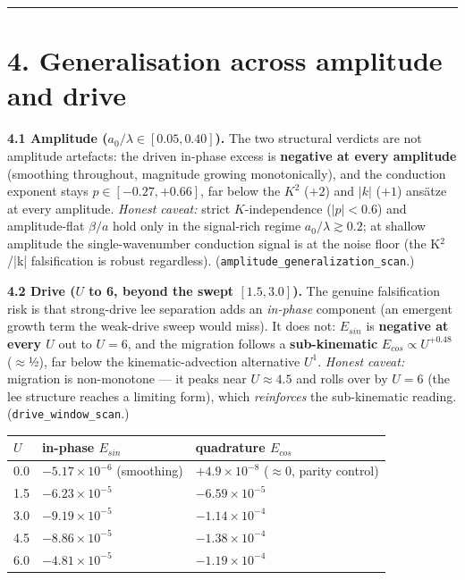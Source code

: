 \documentclass{jfm}
\newcommand{\code}[1]{\texttt{#1}}
\begin{document}
\medskip\hrule\medskip


\section*{4. Generalisation across amplitude and drive}


\textbf{4.1 Amplitude ($a_{0}/\lambda  \in  [0.05, 0.40]$).} The two structural verdicts are not amplitude artefacts: the driven in-phase excess is \textbf{negative at every amplitude} (smoothing throughout, magnitude growing monotonically), and the conduction exponent stays $p\in [-0.27,+0.66]$, far below the $K^{2}$ ($+2$) and $|k|$ ($+1$) ansätze at every amplitude. \emph{Honest caveat:} strict $K$-independence ($|p|<0.6$) and amplitude-flat $\beta /a$ hold only in the signal-rich regime $a_{0}/\lambda \gtrsim 0.2$; at shallow amplitude the single-wavenumber conduction signal is at the noise floor (the K\ensuremath{^{2}}/|k| falsification is robust regardless). (\code{amplitude\_\allowbreak{}generalization\_\allowbreak{}scan}.)


\textbf{4.2 Drive ($U$ to 6, beyond the swept $[1.5,3.0]$).} The genuine falsification risk is that strong-drive lee separation adds an \emph{in-phase} component (an emergent growth term the weak-drive sweep would miss). It does not: $E_{sin}$ is \textbf{negative at every $U$} out to $U=6$, and the migration follows a \textbf{sub-kinematic} $E_{cos} \propto  U^{+0.48}$ (\ensuremath{\approx}½), far below the kinematic-advection alternative $U^{1}$. \emph{Honest caveat:} migration is non-monotone — it peaks near $U\approx 4.5$ and rolls over by $U=6$ (the lee structure reaches a limiting form), which \emph{reinforces} the sub-kinematic reading. (\code{drive\_\allowbreak{}window\_\allowbreak{}scan}.)


\begin{center}\small
\begin{tabular}{lll}
\toprule
$U$ & in-phase $E_{sin}$ & quadrature $E_{cos}$ \\
\midrule
0.0 & $-5.17\times 10^{-6}$ (smoothing) & $+4.9\times 10^{-8}$ (\ensuremath{\approx}0, parity control) \\
1.5 & $-6.23\times 10^{-5}$ & $-6.59\times 10^{-5}$ \\
3.0 & $-9.19\times 10^{-5}$ & $-1.14\times 10^{-4}$ \\
4.5 & $-8.86\times 10^{-5}$ & $-1.38\times 10^{-4}$ \\
6.0 & $-4.81\times 10^{-5}$ & $-1.19\times 10^{-4}$ \\
\bottomrule
\end{tabular}
\end{center}
\end{document}
